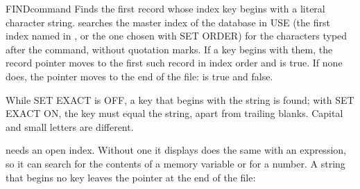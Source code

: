 \begin{XbaseEntry}{FIND}{command}
Finds the first record whose index key begins with a literal character
string.
\Syntax
{}
\Usage
{} searches the master index of the database in USE (the first index
named in , or the one chosen with SET ORDER) for the characters
typed after the command, without quotation marks.  If a key begins with them,
the record pointer moves to the first such record in index order and
 is true.  If none does, the pointer moves to the end of the file:
 is true and  false.

While SET EXACT is OFF, a key that begins with the string is found; with SET
EXACT ON, the key must equal the string, apart from trailing blanks.  Capital
and small letters are different.

 needs an open index.  Without one it displays
\Tips
{} does the same with an expression, so it can search for the
contents of a memory variable or for a number.
\Examples
{}
A string that begins no key leaves the pointer at the end of the file:
\end{XbaseEntry}

